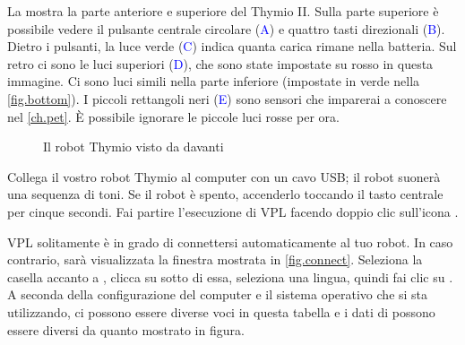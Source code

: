 
\label{ch.intro}


La  mostra la parte anteriore e superiore del Thymio II. Sulla parte superiore
è possibile vedere il pulsante centrale circolare (\textcolor{blue}{A}) e quattro tasti direzionali (\textcolor{blue}{B}).
Dietro i pulsanti, la luce verde (\textcolor{blue}{C}) indica quanta carica rimane nella
batteria. Sul retro ci sono le luci superiori (\textcolor{blue}{D}), che sono state impostate su rosso in questa immagine.
Ci sono luci simili nella parte inferiore (impostate in verde nella \cref{fig.bottom}).
I piccoli rettangoli neri (\textcolor{blue}{E}) sono sensori che
imparerai a conoscere nel \cref{ch.pet}. È possibile ignorare le piccole
luci rosse per ora.

\begin{figure}[h]
\begin{center}
\caption{Il robot Thymio visto da davanti}\label{fig.front}
\end{center}
\end{figure}

\pagebreak


Collega il vostro robot Thymio al computer con un cavo USB; il robot suonerà una sequenza di toni.
Se il robot è spento, accenderlo toccando il tasto centrale
per cinque secondi. Fai partire l'esecuzione di VPL facendo doppio clic sull'icona
.



VPL solitamente è in grado di connettersi automaticamente al tuo robot.
In caso contrario, sarà
visualizzata la finestra mostrata in \cref{fig.connect}. Seleziona la casella accanto a , clicca su  sotto di essa, seleziona una lingua, quindi fai clic su
.
A seconda della configurazione del computer
e il sistema operativo che si sta utilizzando, ci possono essere diverse
voci in questa tabella e i dati di  possono essere
diversi da quanto mostrato in figura.


